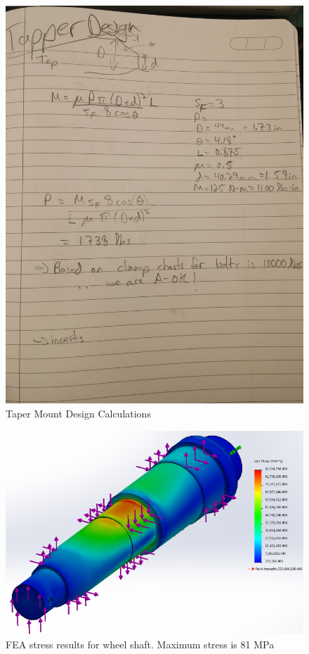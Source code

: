 \begin{figure}[H]
	\centering
	\includegraphics[width=\textwidth,angle=-90]{dom/taper_design_calc.jpg}
	\caption{Taper Mount Design Calculations}
	\label{fig:taper_calc}
\end{figure}

\begin{figure}[H]
\centering
\includegraphics[width=\textwidth]{images/wheel_shaft_fea}
\caption[Wheel Shaft FEA Stress Results]{FEA stress results for wheel shaft. Maximum stress is 81 MPa}
\label{fig:wheel_shaft_stress_fea}
\end{figure}

